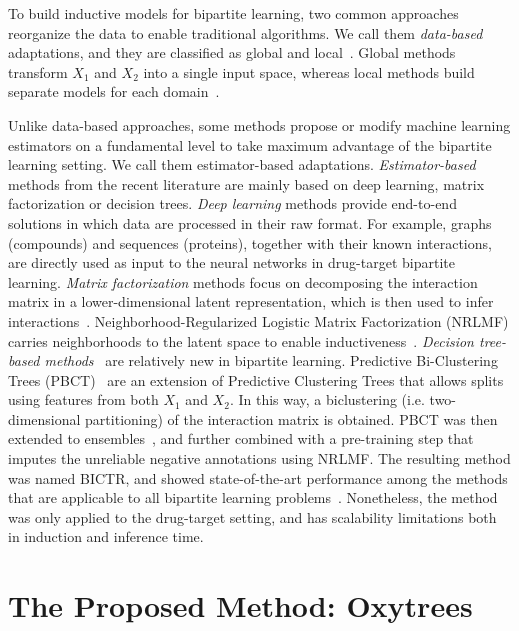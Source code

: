 \documentclass[letterpaper]{article}
\begin{document}
To build inductive models for bipartite learning,
two common approaches reorganize the data to enable traditional algorithms. We call them \emph{data-based} adaptations, and they are classified as global and local~\cite{schrynemackers_classifying_2015}.
Global methods transform $X_1$ and $X_2$ into a single input space, whereas local methods build separate models for each domain~\cite{schrynemackers_classifying_2015}.

Unlike data-based approaches, some methods propose or modify machine learning estimators on a fundamental level to take maximum advantage of the bipartite learning setting.
We call them estimator-based adaptations.
\emph{Estimator-based} methods from the recent literature are mainly based on deep learning, matrix factorization or decision trees.
\emph{Deep learning} methods provide end-to-end solutions in which data are processed in their raw format. For example, graphs (compounds) and sequences (proteins), together with their known interactions, are directly used as input to the neural networks in drug-target bipartite learning.
\emph{Matrix factorization} methods focus on decomposing the interaction matrix in a lower-dimensional latent representation, which is then used to infer interactions~\cite{guo2024rise,chen2022review}. Neighborhood-Regularized Logistic Matrix Factorization (NRLMF) carries neighborhoods to the latent space to enable inductiveness~\cite{liu_neighborhood_2016,liu_lpi-nrlmf_2017,liu_predicting_2020}.
\emph{Decision tree-based methods}~\cite{costa2023recent,blockeel2023decision} are relatively new in bipartite learning. Predictive Bi-Clustering Trees (PBCT)~\cite{pliakos_global_2018} are an extension of Predictive Clustering Trees \cite{blockeel1998top} that allows splits using features from both $X_1$ and $X_2$.
In this way, a biclustering (i.e. two-dimensional partitioning) of the interaction matrix is obtained.
PBCT was then extended to ensembles~\cite{pliakos_network_2019}, and further combined with a pre-training step that imputes the unreliable negative annotations using NRLMF.
The resulting method was named BICTR, and showed state-of-the-art performance among the methods that are applicable to all bipartite learning problems~\cite{pliakos_drug-target_2020}.
Nonetheless, the method was only applied to the drug-target setting, and has scalability limitations both in induction and inference time. 


\section{The Proposed Method: Oxytrees}
\label{sec:oxytrees}
\end{document}

